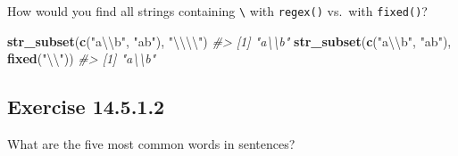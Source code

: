 \documentclass[]{book}
\newenvironment{Shaded}{\begin{snugshade}}{\end{snugshade}}
\newcommand{\CharTok}[1]{\textcolor[rgb]{0.31,0.60,0.02}{#1}}
\newcommand{\CommentTok}[1]{\textcolor[rgb]{0.56,0.35,0.01}{\textit{#1}}}
\newcommand{\DataTypeTok}[1]{\textcolor[rgb]{0.13,0.29,0.53}{#1}}
\newcommand{\DecValTok}[1]{\textcolor[rgb]{0.00,0.00,0.81}{#1}}
\newcommand{\KeywordTok}[1]{\textcolor[rgb]{0.13,0.29,0.53}{\textbf{#1}}}
\newcommand{\NormalTok}[1]{#1}
\newcommand{\OperatorTok}[1]{\textcolor[rgb]{0.81,0.36,0.00}{\textbf{#1}}}
\newcommand{\OtherTok}[1]{\textcolor[rgb]{0.56,0.35,0.01}{#1}}
\newcommand{\StringTok}[1]{\textcolor[rgb]{0.31,0.60,0.02}{#1}}
\theoremstyle{plain}
\theoremstyle{remark}
\begin{document}
How would you find all strings containing \texttt{\textbackslash{}} with
\texttt{regex()} vs.~with \texttt{fixed()}?

\begin{Shaded}
\begin{Highlighting}[]
\KeywordTok{str_subset}\NormalTok{(}\KeywordTok{c}\NormalTok{(}\StringTok{"a}\CharTok{\textbackslash{}\textbackslash{}}\StringTok{b"}\NormalTok{, }\StringTok{"ab"}\NormalTok{), }\StringTok{"}\CharTok{\textbackslash{}\textbackslash{}\textbackslash{}\textbackslash{}}\StringTok{"}\NormalTok{)}
\CommentTok{#> [1] "a\textbackslash{}\textbackslash{}b"}
\KeywordTok{str_subset}\NormalTok{(}\KeywordTok{c}\NormalTok{(}\StringTok{"a}\CharTok{\textbackslash{}\textbackslash{}}\StringTok{b"}\NormalTok{, }\StringTok{"ab"}\NormalTok{), }\KeywordTok{fixed}\NormalTok{(}\StringTok{"}\CharTok{\textbackslash{}\textbackslash{}}\StringTok{"}\NormalTok{))}
\CommentTok{#> [1] "a\textbackslash{}\textbackslash{}b"}
\end{Highlighting}
\end{Shaded}

\hypertarget{exercise-14.5.1.2}{%
\subsection*{\texorpdfstring{Exercise
{14.5.1.2}}{Exercise 14.5.1.2}}\label{exercise-14.5.1.2}}

What are the five most common words in sentences?

\begin{Shaded}
\end{Shaded}
\end{document}
